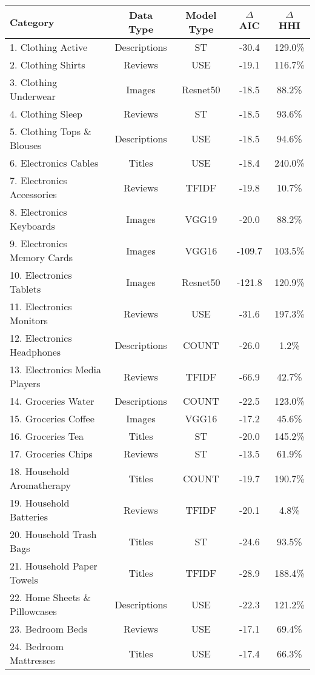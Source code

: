 \begin{tabular}{p{6cm}cccc}
\toprule
Category & Data Type & Model Type & $\Delta$ AIC & $\Delta$ HHI \\
\midrule
1. Clothing Active & Descriptions & ST & -30.4 & 129.0\% \\
2. Clothing Shirts & Reviews & USE & -19.1 & 116.7\% \\
3. Clothing Underwear & Images & Resnet50 & -18.5 & 88.2\% \\
4. Clothing Sleep & Reviews & ST & -18.5 & 93.6\% \\
5. Clothing Tops \& Blouses & Descriptions & USE & -18.5 & 94.6\% \\
6. Electronics Cables & Titles & USE & -18.4 & 240.0\% \\
7. Electronics Accessories & Reviews & TFIDF & -19.8 & 10.7\% \\
8. Electronics Keyboards & Images & VGG19 & -20.0 & 88.2\% \\
9. Electronics Memory Cards & Images & VGG16 & -109.7 & 103.5\% \\
10. Electronics Tablets & Images & Resnet50 & -121.8 & 120.9\% \\
11. Electronics Monitors & Reviews & USE & -31.6 & 197.3\% \\
12. Electronics Headphones & Descriptions & COUNT & -26.0 & 1.2\% \\
13. Electronics Media Players & Reviews & TFIDF & -66.9 & 42.7\% \\
14. Groceries Water & Descriptions & COUNT & -22.5 & 123.0\% \\
15. Groceries Coffee & Images & VGG16 & -17.2 & 45.6\% \\
16. Groceries Tea & Titles & ST & -20.0 & 145.2\% \\
17. Groceries Chips & Reviews & ST & -13.5 & 61.9\% \\
18. Household Aromatherapy & Titles & COUNT & -19.7 & 190.7\% \\
19. Household Batteries & Reviews & TFIDF & -20.1 & 4.8\% \\
20. Household Trash Bags & Titles & ST & -24.6 & 93.5\% \\
21. Household Paper Towels & Titles & TFIDF & -28.9 & 188.4\% \\
22. Home Sheets \& Pillowcases & Descriptions & USE & -22.3 & 121.2\% \\
23. Bedroom Beds & Reviews & USE & -17.1 & 69.4\% \\
24. Bedroom Mattresses & Titles & USE & -17.4 & 66.3\% \\

\end{tabular}

